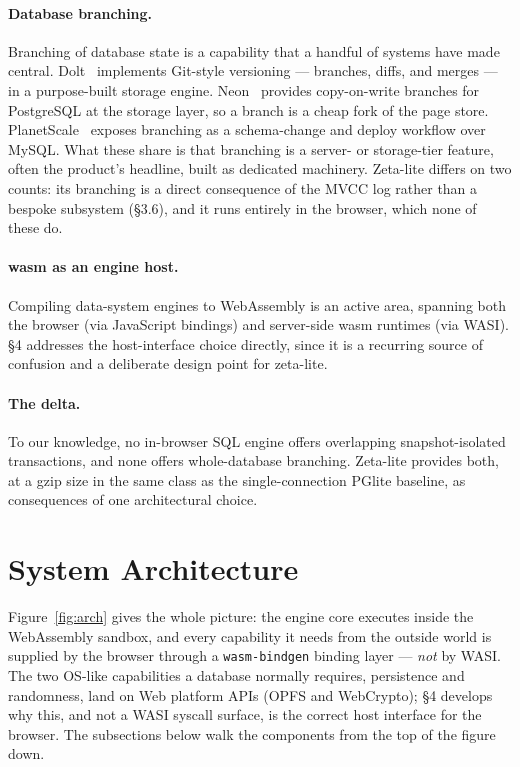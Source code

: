 \documentclass[11pt]{article}
\begin{document}
\paragraph{Database branching.}
Branching of database state is a capability that a handful of systems have made
central. Dolt~\cite{dolt} implements Git-style versioning --- branches, diffs, and
merges --- in a purpose-built storage engine. Neon~\cite{neon} provides
copy-on-write branches for PostgreSQL at the storage layer, so a branch is a cheap
fork of the page store. PlanetScale~\cite{planetscale} exposes branching as a
schema-change and deploy workflow over MySQL. What these share is that branching is
a server- or storage-tier feature, often the product's headline, built as dedicated
machinery. Zeta-lite differs on two counts: its branching is a direct consequence
of the MVCC log rather than a bespoke subsystem (\S3.6), and it runs entirely in
the browser, which none of these do.

\paragraph{wasm as an engine host.}
Compiling data-system engines to WebAssembly is an active area, spanning both the
browser (via JavaScript bindings) and server-side wasm runtimes (via WASI). \S4
addresses the host-interface choice directly, since it is a recurring source of
confusion and a deliberate design point for zeta-lite.

\paragraph{The delta.}
To our knowledge, no in-browser SQL engine offers overlapping snapshot-isolated
transactions, and none offers whole-database branching. Zeta-lite provides both, at
a gzip size in the same class as the single-connection PGlite baseline, as
consequences of one architectural choice.

\section{System Architecture}

Figure~\ref{fig:arch} gives the whole picture: the engine core executes inside the
WebAssembly sandbox, and every capability it needs from the outside world is
supplied by the browser through a \texttt{wasm-bindgen} binding layer --- \emph{not}
by WASI. The two OS-like capabilities a database normally requires, persistence and
randomness, land on Web platform APIs (OPFS and WebCrypto); \S4 develops why this,
and not a WASI syscall surface, is the correct host interface for the browser. The
subsections below walk the components from the top of the figure down.
\end{document}
